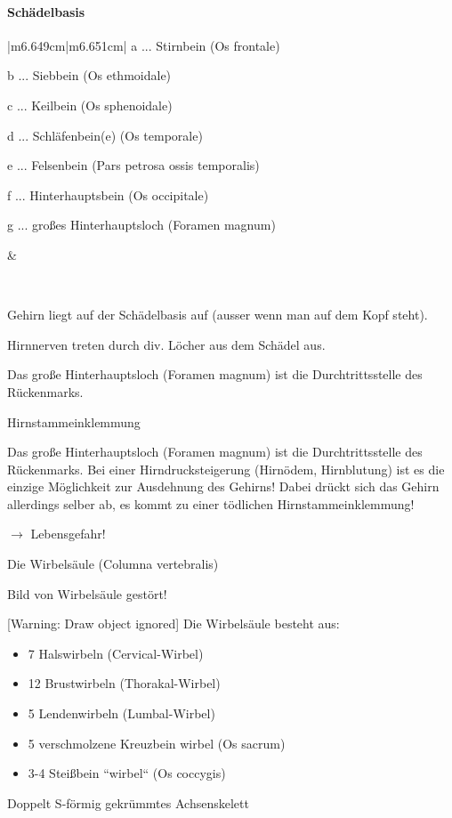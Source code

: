 \documentclass{article}
\begin{document}
\paragraph[Sch\"adelbasis]{Sch\"adelbasis}
\begin{center}
\tablehead{}\begin{supertabular}{|m{6.649cm}|m{6.651cm}|}
\hline
a ... Stirnbein (Os frontale)

b ... Siebbein (Os ethmoidale)

c ... Keilbein  (Os sphenoidale)

d ... Schl\"afenbein(e)  (Os temporale)

e ... Felsenbein  (Pars petrosa ossis temporalis)

f ... Hinterhauptsbein  (Os occipitale)

g ... gro{\ss}es Hinterhauptsloch (Foramen magnum)

 &
\par

\\\hline
\end{supertabular}
\end{center}
Gehirn liegt auf der Sch\"adelbasis auf (ausser wenn man auf dem Kopf
steht). 

Hirnnerven treten durch div. L\"ocher aus dem Sch\"adel aus.

Das gro{\ss}e Hinterhauptsloch (Foramen magnum) ist die
Durchtrittsstelle des R\"uckenmarks. 

Hirnstammeinklemmung

Das gro{\ss}e Hinterhauptsloch (Foramen magnum) ist die
Durchtrittsstelle des R\"uckenmarks. Bei einer Hirndrucksteigerung
(Hirn\"odem, Hirnblutung) ist es die einzige M\"oglichkeit zur
Ausdehnung des Gehirns! Dabei dr\"uckt sich das Gehirn allerdings
selber ab, es kommt zu einer t\"odlichen Hirnstammeinklemmung! 

${\rightarrow}$  Lebensgefahr!  

Die Wirbels\"aule (Columna vertebralis)

Bild von Wirbels\"aule gest\"ort!

[Warning: Draw object ignored]%
%
Die Wirbels\"aule besteht aus:

\begin{itemize}
\item 7 Halswirbeln  (Cervical-Wirbel)

\item 12 Brustwirbeln  (Thorakal-Wirbel)

\item 5 Lendenwirbeln  (Lumbal{}-Wirbel)

\item 5 verschmolzene Kreuzbein wirbel (Os sacrum)

\item 3-4 Stei{\ss}bein {\textquotedblleft}wirbel{\textquotedblleft} 
(Os coccygis) 

\end{itemize}
Doppelt S-f\"ormig gekr\"ummtes Achsenskelett
\end{document}
